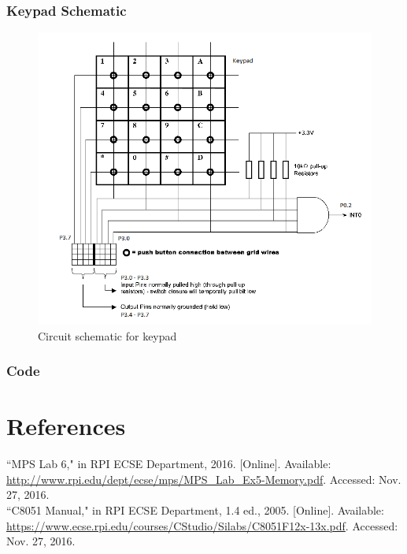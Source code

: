 \documentclass[12pt]{article}
\begin{document}
\subsubsection{Keypad Schematic}
\begin{figure}[H]
	\centering
	\includegraphics[width=\textwidth]{keypad_schematic.png}
	\caption{Circuit schematic for keypad}
	\label{KEY}
\end{figure}
\subsubsection{Code}
	

\section{References} 
\noindent
``MPS Lab 6," in RPI ECSE Department, 2016. [Online]. Available: \url{http://www.rpi.edu/dept/ecse/mps/MPS_Lab_Ex5-Memory.pdf}. Accessed: Nov. 27, 2016.\\
\newline\noindent
``C8051 Manual," in RPI ECSE Department, 1.4 ed., 2005. [Online]. Available: \url{https://www.ecse.rpi.edu/courses/CStudio/Silabs/C8051F12x-13x.pdf}. Accessed: Nov. 27, 2016.
\end{document}
